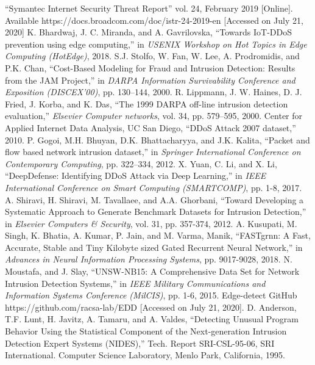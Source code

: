 \documentclass[conference]{IEEEtran}
\begin{document}
\begin{thebibliography}{00}
 ``Symantec Internet Security Threat Report'' vol. 24, February 2019 [Online]. Available https://docs.broadcom.com/doc/istr-24-2019-en [Accessed on July 21, 2020]
 K. Bhardwaj, J. C. Miranda, and A. Gavrilovska, ``Towards IoT-DDoS prevention using edge computing,'' in \textit{USENIX Workshop on Hot Topics in Edge Computing (HotEdge)}, 2018.
  S.J. Stolfo, W. Fan, W. Lee, A. Prodromidis, and P.K. Chan, ``Cost-Based Modeling for Fraud and Intrusion Detection: Results from the JAM Project,'' in \textit{DARPA Information Survivability Conference and Exposition (DISCEX'00)}, pp. 130–144, 2000. 
 R. Lippmann, J. W. Haines, D. J. Fried, J. Korba, and K. Das, ``The 1999 DARPA off-line intrusion detection evaluation,'' \textit{Elsevier Computer networks}, vol. 34, pp. 579–595, 2000.
 Center for Applied Internet Data Analysis, UC San Diego, ``DDoS Attack 2007 dataset,'' 2010.
 P. Gogoi, M.H. Bhuyan, D.K. Bhattacharyya, and J.K. Kalita, ``Packet and flow based network intrusion dataset,'' in \textit{Springer International Conference on Contemporary Computing}, pp. 322–334, 2012.
 X. Yuan, C. Li, and X. Li, ``DeepDefense: Identifying DDoS Attack via Deep Learning,'' in \textit{IEEE International Conference on Smart Computing (SMARTCOMP)}, pp. 1-8, 2017.
 A. Shiravi, H. Shiravi, M. Tavallaee, and A.A. Ghorbani, ``Toward Developing a Systematic Approach to Generate Benchmark Datasets for Intrusion Detection,'' in \textit{Elsevier Computers \& Security}, vol. 31, pp. 357-374, 2012. 
 A. Kusupati, M. Singh, K. Bhatia, A. Kumar, P. Jain, and M. Varma, Manik, ``FASTgrnn: A Fast, Accurate, Stable and Tiny Kilobyte sized Gated Recurrent Neural Network,'' in \textit{Advances in Neural Information Processing Systems}, pp. 9017-9028, 2018.
 N. Moustafa, and J. Slay, ``UNSW-NB15: A Comprehensive Data Set for Network Intrusion Detection Systems,'' in \textit{IEEE Military Communications and Information Systems Conference (MilCIS)}, pp. 1-6, 2015.
 Edge-detect GitHub https://github.com/racsa-lab/EDD [Accessed on July 21, 2020].
 D. Anderson, T.F. Lunt, H. Javitz, A. Tamaru, and A. Valdes, ``Detecting Unusual Program Behavior Using the Statistical Component of the Next-generation Intrusion Detection Expert Systems (NIDES),'' Tech. Report SRI-CSL-95-06, SRI International. Computer Science Laboratory,  Menlo Park, California, 1995. 

\end{thebibliography}
\end{document}
